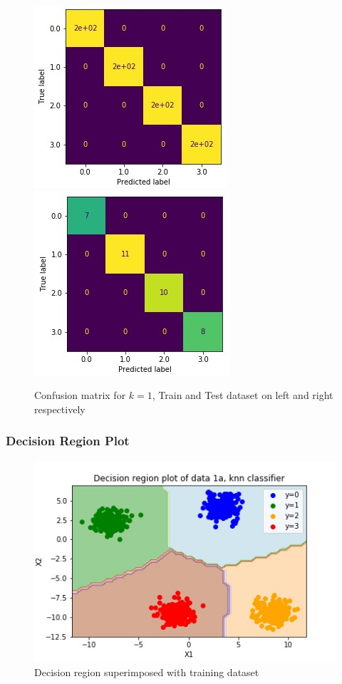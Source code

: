 \documentclass[11pt,a4paper]{article}
\begin{document}
\begin{figure}[H]
    \centering
    \includegraphics[scale=0.8]{images/1A_cm_KNN_train.jpg}
    \includegraphics[scale=0.8]{images/1A_cm_KNN_test.jpg}
    \caption{Confusion matrix for $k=1$, Train and Test dataset on left and right respectively}
    \label{fig:1A_cm_KNN}
\end{figure}

\subsubsection{Decision Region Plot}
\begin{figure}[H]
    \centering
    \includegraphics[scale=0.9]{images/1A_KNN_decision_region.jpg}
    \caption{Decision region superimposed with training dataset}
    \label{fig:1A_decreg_KNN}
\end{figure}
\end{document}

